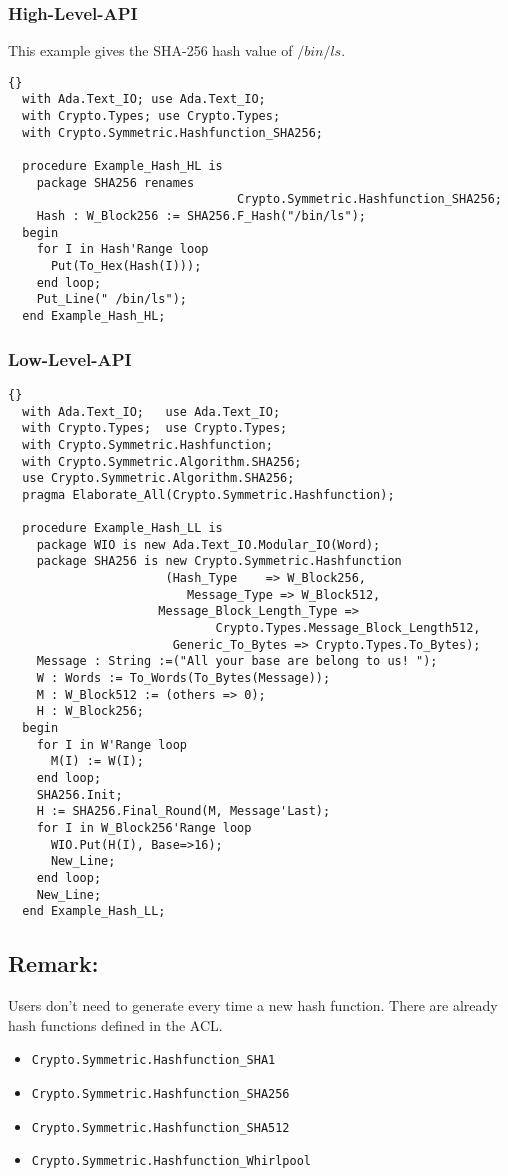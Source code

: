 \subsubsection*{High-Level-API}
This example gives the SHA-256 hash value of $/bin/ls$.
\begin{lstlisting}{}
  with Ada.Text_IO; use Ada.Text_IO;
  with Crypto.Types; use Crypto.Types;
  with Crypto.Symmetric.Hashfunction_SHA256;
  
  procedure Example_Hash_HL is
    package SHA256 renames 
    							Crypto.Symmetric.Hashfunction_SHA256;
    Hash : W_Block256 := SHA256.F_Hash("/bin/ls");
  begin
    for I in Hash'Range loop
      Put(To_Hex(Hash(I)));
    end loop;
    Put_Line(" /bin/ls");
  end Example_Hash_HL;
\end{lstlisting}
\subsubsection*{Low-Level-API}
\begin{lstlisting}{}
  with Ada.Text_IO;   use Ada.Text_IO;
  with Crypto.Types;  use Crypto.Types;
  with Crypto.Symmetric.Hashfunction;
  with Crypto.Symmetric.Algorithm.SHA256;
  use Crypto.Symmetric.Algorithm.SHA256;
  pragma Elaborate_All(Crypto.Symmetric.Hashfunction);
  
  procedure Example_Hash_LL is
    package WIO is new Ada.Text_IO.Modular_IO(Word);
    package SHA256 is new Crypto.Symmetric.Hashfunction
    			      (Hash_Type    => W_Block256,
			    		 Message_Type => W_Block512,
		             Message_Block_Length_Type => 
				             Crypto.Types.Message_Block_Length512,
    			       Generic_To_Bytes => Crypto.Types.To_Bytes);
    Message : String :=("All your base are belong to us! ");
    W : Words := To_Words(To_Bytes(Message));
    M : W_Block512 := (others => 0);
    H : W_Block256;
  begin
    for I in W'Range loop
      M(I) := W(I);
    end loop;
    SHA256.Init;
    H := SHA256.Final_Round(M, Message'Last);
    for I in W_Block256'Range loop
      WIO.Put(H(I), Base=>16);
      New_Line;
    end loop;
    New_Line;
  end Example_Hash_LL;
\end{lstlisting}
\subsection*{Remark:}
Users don't need to generate every time a new hash function. There are already hash functions defined in the ACL.
\begin{itemize}
\item \texttt{Crypto.Symmetric.Hashfunction\_SHA1}
\item \texttt{Crypto.Symmetric.Hashfunction\_SHA256}
\item \texttt{Crypto.Symmetric.Hashfunction\_SHA512}
\item \texttt{Crypto.Symmetric.Hashfunction\_Whirlpool}
\end{itemize}
